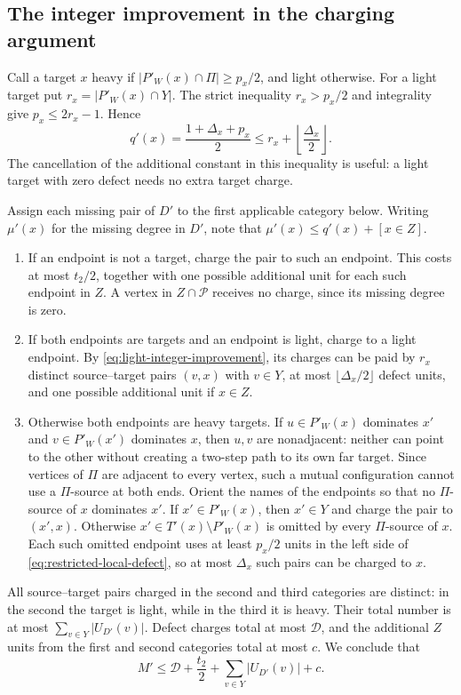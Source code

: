 \subsection{The integer improvement in the charging argument}

Call a target $x$ heavy if
$|P'_W(x)\cap\Pi|\ge p_x/2$, and light otherwise.
For a light target put $r_x=|P'_W(x)\cap Y|$.  The strict inequality
$r_x>p_x/2$ and integrality give $p_x\le2r_x-1$.  Hence
\begin{equation}\label{eq:light-integer-improvement}
 q'(x)=\frac{1+\Delta_x+p_x}{2}
                  \le r_x+\left\lfloor\frac{\Delta_x}{2}\right\rfloor.
\end{equation}
The cancellation of the additional constant in this inequality is
useful: a light target with zero defect needs no extra target charge.

Assign each missing pair of $D'$ to the first applicable category below.
Writing $\mu'(x)$ for the missing degree in $D'$, note that
$\mu'(x)\le q'(x)+[x\in Z]$.
\begin{enumerate}
\item If an endpoint is not a target, charge the pair to such an
endpoint.  This costs at most $t_2/2$, together with one possible
additional unit for each such endpoint in $Z$.  A vertex in
$Z\cap\mathcal P$ receives no charge, since its missing degree is zero.
\item If both endpoints are targets and an endpoint is light, charge
to a light endpoint.  By \eqref{eq:light-integer-improvement}, its
charges can be paid by $r_x$ distinct source--target pairs $(v,x)$
with $v\in Y$, at most $\lfloor\Delta_x/2\rfloor$ defect units, and
one possible additional unit if $x\in Z$.
\item Otherwise both endpoints are heavy targets.  If
$u\in P'_W(x)$ dominates $x'$ and $v\in P'_W(x')$ dominates $x$,
then $u,v$ are nonadjacent: neither can point to the other without
creating a two-step path to its own far target.  Since vertices of
$\Pi$ are adjacent to every vertex, such a mutual configuration cannot
use a $\Pi$-source at both ends.  Orient the names of the endpoints
so that no $\Pi$-source of $x$ dominates $x'$.
If $x'\in P'_W(x)$, then $x'\in Y$ and charge the pair to $(x',x)$.
Otherwise $x'\in T'(x)\setminus P'_W(x)$ is omitted by every
$\Pi$-source of $x$.  Each such omitted endpoint uses at least
$p_x/2$ units in the left side of
\eqref{eq:restricted-local-defect}, so at most $\Delta_x$ such pairs
can be charged to $x$.
\end{enumerate}
All source--target pairs charged in the second and third categories
are distinct: in the second the target is light, while in the third
it is heavy.  Their total number is at most
$\sum_{v\in Y}|U_{D'}(v)|$.  Defect charges total at most
$\mathcal D$, and the additional $Z$ units from the first and second
categories total at most $c$.  We conclude that
\begin{equation}\label{eq:improved-charge}
 {M'\le\mathcal D+\frac{t_2}{2}
                   +\sum_{v\in Y}|U_{D'}(v)|+c.}
\end{equation}

